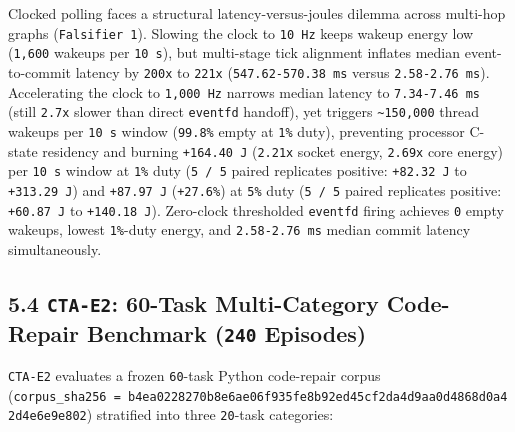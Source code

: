 \documentclass[10pt,letterpaper]{article}
\begin{document}
Clocked polling faces a structural latency-versus-joules dilemma across
multi-hop graphs (\texttt{Falsifier\ 1}). Slowing the clock to
\texttt{10\ Hz} keeps wakeup energy low (\texttt{1,600} wakeups per
\texttt{10\ s}), but multi-stage tick alignment inflates median
event-to-commit latency by \texttt{200x} to \texttt{221x}
(\texttt{547.\allowbreak{}62-\allowbreak{}570.\allowbreak{}38\ ms} versus \texttt{2.\allowbreak{}58-\allowbreak{}2.\allowbreak{}76\ ms}). Accelerating
the clock to \texttt{1,000\ Hz} narrows median latency to
\texttt{7.\allowbreak{}34-\allowbreak{}7.\allowbreak{}46\ ms} (still \texttt{2.7x} slower than direct
\texttt{eventfd} handoff), yet triggers
\texttt{\textasciitilde{}150,000} thread wakeups per \texttt{10\ s}
window (\texttt{99.8\%} empty at \texttt{1\%} duty), preventing
processor C-state residency and burning \texttt{+164.\allowbreak{}40\ J}
(\texttt{2.21x} socket energy, \texttt{2.69x} core energy) per
\texttt{10\ s} window at \texttt{1\%} duty (\texttt{5\ /\ 5} paired
replicates positive: \texttt{+82.32\ J} to \texttt{+313.\allowbreak{}29\ J}) and
\texttt{+87.97\ J} (\texttt{+27.6\%}) at \texttt{5\%} duty
(\texttt{5\ /\ 5} paired replicates positive: \texttt{+60.87\ J} to
\texttt{+140.\allowbreak{}18\ J}). Zero-clock thresholded \texttt{eventfd} firing
achieves \texttt{0} empty wakeups, lowest \texttt{1\%}-duty energy, and
\texttt{2.\allowbreak{}58-\allowbreak{}2.\allowbreak{}76\ ms} median commit latency simultaneously.

\subsection{\texorpdfstring{5.4 \texttt{CTA-E2}: 60-Task Multi-Category
Code-Repair Benchmark (\texttt{240}
Episodes)}{5.4 CTA-E2: 60-Task Multi-Category Code-Repair Benchmark (240 Episodes)}}\label{cta-e2-60-task-multi-category-code-repair-benchmark-240-episodes}

\texttt{CTA-E2} evaluates a frozen \texttt{60}-task Python code-repair
corpus
(\texttt{corpus\_\allowbreak{}sha256\ =\ b4ea0228\allowbreak{}270b8e6a\allowbreak{}e06f935f\allowbreak{}e8b92ed4\allowbreak{}5cf2da4d\allowbreak{}9aa0d486\allowbreak{}8d0a42d4\allowbreak{}e6e9e802})
stratified into three \texttt{20}-task categories:
\end{document}
